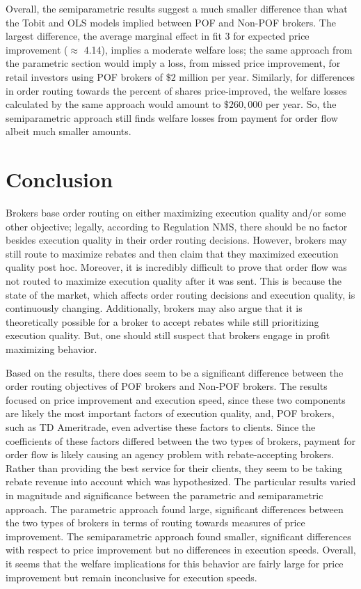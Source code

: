 \documentclass[12pt,a4paper]{extarticle}
\begin{document}
Overall, the semiparametric results suggest a much smaller difference than what the Tobit and OLS models implied between POF and Non-POF brokers. The largest difference, the average marginal effect in fit 3 for expected price improvement ($\approx$ 4.14), implies a moderate welfare loss; the same approach from the parametric section would imply a loss, from missed price improvement, for retail investors using POF brokers of $\$2$ million per year. Similarly, for differences in order routing towards the percent of shares price-improved, the welfare losses calculated by the same approach would amount to $\$260{,}000$ per year. So, the semiparametric approach still finds welfare losses from payment for order flow albeit much smaller amounts. 







\section{Conclusion}



Brokers base order routing on either maximizing execution quality and/or
some other objective; legally, according to Regulation NMS, there should be no factor
besides execution quality in their order routing decisions. However, brokers may still route to maximize rebates and then claim that
they maximized execution quality post hoc. Moreover, it is incredibly difficult to
prove that order flow was not routed to maximize execution quality after it was sent. This is because the
state of the market, which affects order routing decisions and execution quality, is continuously changing. 
Additionally, brokers may also argue that it is theoretically possible for a broker to accept
rebates while still prioritizing execution quality. But, one should still suspect that brokers engage in profit maximizing behavior.

Based on the results, there does seem to be a significant difference between
the order routing objectives of POF brokers and Non-POF brokers. 
The results focused on price improvement and execution speed, since these two components are likely the most important factors of execution quality, and, POF brokers, such as TD Ameritrade, even advertise these factors to clients. 
Since the coefficients of these factors differed between the two types of brokers, payment for order flow is likely causing an agency problem with rebate-accepting brokers. Rather than providing the best service for their clients, they seem to be taking rebate revenue into account which was hypothesized. 
The particular results varied in magnitude and significance between the parametric and semiparametric approach. The parametric approach found large, significant differences between the two types of brokers in terms of routing towards measures of price improvement. The semiparametric approach found smaller, significant differences with respect to price improvement but no differences in execution speeds. Overall, it seems that the welfare implications for this behavior are fairly large for price improvement but remain inconclusive for execution speeds. 
\end{document}

